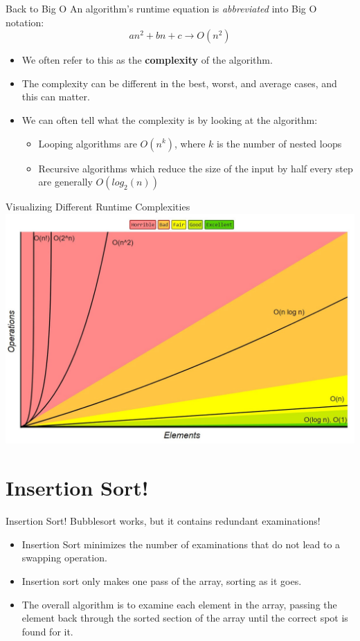 \documentclass[11pt]{beamer}
\begin{document}
\begin{frame}{Back to Big O}
An algorithm's runtime equation is \emph{abbreviated} into Big O notation:
$$ an^2 + bn + c \longrightarrow O(n^2) $$
\begin{itemize}
\item We often refer to this as the \textbf{complexity} of the algorithm.  
\item The complexity can be different in the best, worst, and average cases, and this can matter.
\item We can often tell what the complexity is by looking at the algorithm:
\begin{itemize}
\item Looping algorithms are $O(n^k)$, where $k$ is the number of nested loops 
\item Recursive algorithms which reduce the size of the input by half every step are generally $O(log_2(n))$
\end{itemize}
\end{itemize}
\end{frame}

\begin{frame}{Visualizing Different Runtime Complexities}
\center
\includegraphics[scale=0.4]{bigO.jpg}
\end{frame}

\section[Insert]{Insertion Sort!}
\begin{frame}{Insertion Sort!}
Bubblesort works, but it contains redundant examinations!  
\begin{itemize}
\item Insertion Sort minimizes the number of examinations that do not lead to a swapping operation.
\item Insertion sort only makes one pass of the array, sorting as it goes.
\item The overall algorithm is to examine each element in the array, passing the element back through the sorted section of the array until the correct spot is found for it.  
\end{itemize}
\end{frame}
\end{document}
